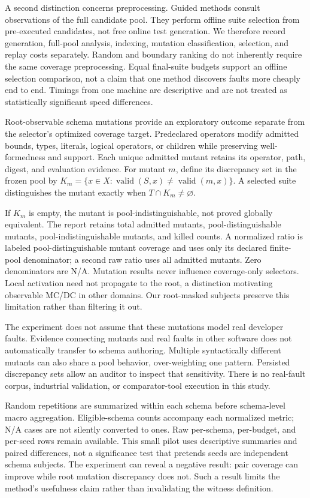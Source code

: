 \documentclass[sigconf,nonacm]{acmart}
\begin{document}
A second distinction concerns preprocessing. Guided methods consult observations of the full candidate pool. They perform offline suite selection from pre-executed candidates, not free online test generation. We therefore record generation, full-pool analysis, indexing, mutation classification, selection, and replay costs separately. Random and boundary ranking do not inherently require the same coverage preprocessing. Equal final-suite budgets support an offline selection comparison, not a claim that one method discovers faults more cheaply end to end. Timings from one machine are descriptive and are not treated as statistically significant speed differences.

Root-observable schema mutations provide an exploratory outcome separate from the selector's optimized coverage target. Predeclared operators modify admitted bounds, types, literals, logical operators, or children while preserving well-formedness and support. Each unique admitted mutant retains its operator, path, digest, and evaluation evidence. For mutant $m$, define its discrepancy set in the frozen pool by $K_m=\{x\in X:\operatorname{valid}(S,x)\ne\operatorname{valid}(m,x)\}$. A selected suite distinguishes the mutant exactly when $T\cap K_m\ne\varnothing$.

If $K_m$ is empty, the mutant is pool-indistinguishable, not proved globally equivalent. The report retains total admitted mutants, pool-distinguishable mutants, pool-indistinguishable mutants, and killed counts. A normalized ratio is labeled pool-distinguishable mutant coverage and uses only its declared finite-pool denominator; a second raw ratio uses all admitted mutants. Zero denominators are N/A. Mutation results never influence coverage-only selectors. Local activation need not propagate to the root, a distinction motivating observable MC/DC in other domains. Our root-masked subjects preserve this limitation rather than filtering it out. \cite{ref16}

The experiment does not assume that these mutations model real developer faults. Evidence connecting mutants and real faults in other software does not automatically transfer to schema authoring. Multiple syntactically different mutants can also share a pool behavior, over-weighting one pattern. Persisted discrepancy sets allow an auditor to inspect that sensitivity. There is no real-fault corpus, industrial validation, or comparator-tool execution in this study. \cite{ref17}

Random repetitions are summarized within each schema before schema-level macro aggregation. Eligible-schema counts accompany each normalized metric; N/A cases are not silently converted to ones. Raw per-schema, per-budget, and per-seed rows remain available. This small pilot uses descriptive summaries and paired differences, not a significance test that pretends seeds are independent schema subjects. The experiment can reveal a negative result: pair coverage can improve while root mutation discrepancy does not. Such a result limits the method's usefulness claim rather than invalidating the witness definition.
\end{document}
